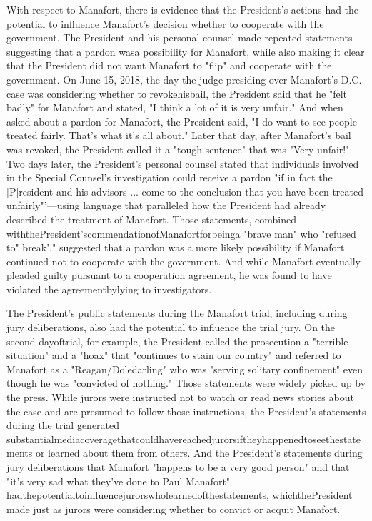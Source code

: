 With respect to Manafort, there is evidence that the President's actions had the potential to influence Manafort's decision whether to cooperate with the government.
The President and his personal counsel made repeated statements suggesting that a pardon wasa possibility for Manafort, while also making it clear that the President did not want Manafort to "flip" and cooperate with the government.
On June 15, 2018, the day the judge presiding over Manafort's D.C. case was considering whether to revokehisbail, the President said that he "felt badly" for Manafort and stated, "I think a lot of it is very unfair."
And when asked about a pardon for Manafort, the President said, "I do want to see people treated fairly.
That's what it's all about." Later that day, after Manafort's bail was revoked, the President called it a "tough sentence" that was "Very unfair!"
Two days later, the President's personal counsel stated that individuals involved in the Special Counsel's investigation could receive a pardon "if in fact the [P]resident and his advisors ... come to the conclusion that you have been treated unfairly"'—using language that paralleled how the President had already described the treatment of Manafort.
Those statements, combined withthePresident'scommendationofManafortforbeinga "brave man" who "refused to" break'," suggested that a pardon was a more likely possibility if Manafort continued not to cooperate with the government.
And while Manafort eventually pleaded guilty pursuant to a cooperation agreement, he was found to have violated the agreementbylying to investigators.

The President's public statements during the Manafort trial, including during jury deliberations, also had the potential to influence the trial jury.
On the second dayoftrial, for example, the President called the prosecution a "terrible situation" and a "hoax" that "continues to stain our country" and referred to Manafort as a "Reagan/Doledarling" who was "serving solitary confinement" even though he was "convicted of nothing."
Those statements were widely picked up by the press.
While jurors were instructed not to watch or read news stories about the case and are presumed to follow those instructions, the President's statements during the trial generated substantialmediacoveragethatcouldhavereachedjurorsiftheyhappenedtoseethestatements or learned about them from others.
And the President's statements during jury deliberations that Manafort "happens to be a very good person" and that "it's very sad what they've done to Paul Manafort" hadthepotentialtoinfluencejurorswholearnedofthestatements, whichthePresident made just as jurors were considering whether to convict or acquit Manafort.

